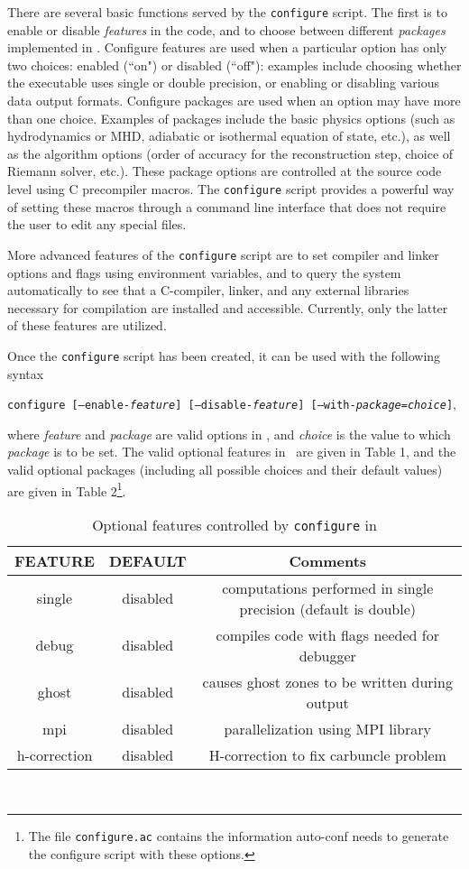 There are several basic functions served by the {\tt configure} script.
The first is to enable or disable {\it features} in the code, and to
choose between different {\it packages} implemented in \ath.  Configure
features are used when a particular option has only two choices:
enabled (``on") or disabled (``off"): examples include choosing whether
the executable uses single or double precision, or enabling or disabling
various data output formats.  Configure packages are used when an
option may have more than one choice.  Examples of packages include
the basic physics options (such as hydrodynamics or MHD, adiabatic or
isothermal equation of state, etc.), as well as the algorithm options
(order of accuracy for the reconstruction step, choice of Riemann solver,
etc.).  These package options are controlled at the source code
level using C precompiler macros.  The {\tt configure} script provides
a powerful way of setting these macros through a command line interface
that does not require the user to edit any special files.

More advanced features of the {\tt configure} script are to set compiler
and linker options and flags using environment variables, and to query the
system automatically to see that a C-compiler, linker, and any external
libraries necessary for compilation are installed and accessible.
Currently, only the latter of these features are utilized.

Once the {\tt configure} script has been created, it can be used
with the following
syntax
\begin{center}
{\tt configure [--enable-{\it feature}] [--disable-{\it feature}]
[--with-{\it package}={\it choice}]},
\end{center}
where {\it feature} and {\it package}
are valid options in \ath, and {\it choice} is the value to which
{\it package} is to be set.  The valid optional features in \ath\ are given in
Table 1, and the valid optional packages (including all possible choices and
their default values) are given in Table 2\footnote{The file {\tt configure.ac}
contains the information auto-conf needs to generate the configure script
with these options.}.

\begin{table}[ht]
\caption{Optional features controlled by {\tt configure} in \ath}
\begin{center}
\begin{tabular}{|c|c|c|} \hline \hline
FEATURE & DEFAULT & Comments \\ \hline
single &  disabled & computations performed in single precision (default is double) \\
debug  & disabled & compiles code with flags needed for debugger \\
ghost  & disabled & causes ghost zones to be written during output \\
mpi    & disabled & parallelization using MPI library \\
h-correction & disabled & H-correction to fix carbuncle problem 
\\ \hline
\end{tabular}
\end{center}
\\
\end{table}

